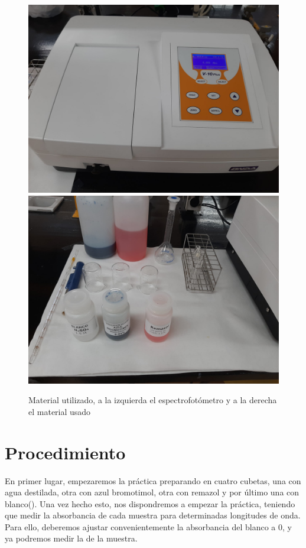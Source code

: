 \begin{figure}[H]
    \centering
    \hspace*{-2.3cm}
        \includegraphics[scale = 0.07]{fotos/instru.jpeg}
        \includegraphics[scale = 0.07]{fotos/set8.jpeg}
    \hspace*{-2.3cm}
    \caption{Material utilizado, a la izquierda el espectrofotómetro y a la derecha el material usado}
\end{figure}
\clearpage

\section{Procedimiento}
\noindent En primer lugar, empezaremos la práctica preparando en cuatro cubetas, una con agua destilada, otra con azul bromotimol, otra con remazol y por último una con blanco(). Una vez hecho esto, nos dispondremos a empezar la práctica, teniendo que medir la absorbancia de cada muestra para determinadas longitudes de onda. Para ello, deberemos ajustar convenientemente la absorbancia del blanco a 0, y ya podremos medir la de la muestra.\\

